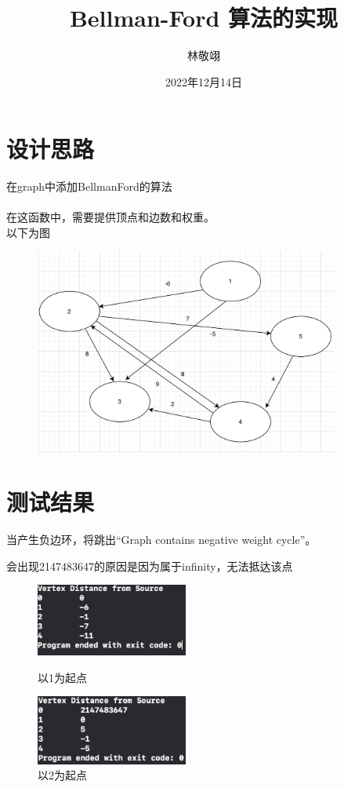 \documentclass{article}
\title{Bellman-Ford 算法的实现}
\author{林敬翊}
\date{2022年12月14日}
\begin{document}
\maketitle

\section{设计思路}
在graph中添加BellmanFord的算法 \\
~\\
在这函数中，需要提供顶点和边数和权重。
~\\
以下为图
\begin{figure}[htb]
    \centering
\includegraphics[width=10cm]{graph.png}
    \end{figure}
    
\section{测试结果}
当产生负边环，将跳出“Graph contains negative weight cycle”。

会出现2147483647的原因是因为属于infinity，无法抵达该点





\begin{figure}[htb]
    \centering
\begin{minipage}[t]{0.48\textwidth}
    \centering
    \includegraphics[width=5cm]{1.png}
    \caption{以1为起点}
\end{minipage}
\begin{minipage}[t]{0.48\textwidth}
    \centering
    \includegraphics[width=5cm]{2.png}
    \caption{以2为起点}
\end{minipage}
\end{figure}
\end{document}
